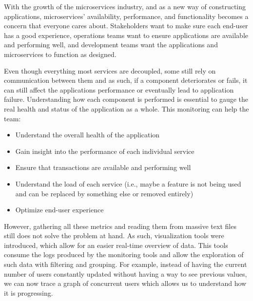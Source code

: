 
With the growth of the microservices industry, and as a new way of constructing applications, microservices' availability, performance, and functionality becomes a concern that everyone cares about. Stakeholders want to make sure each end-user has a good experience, operations teams want to ensure applications are available and performing well, and development teams want the applications and microservices to function as designed.

Even though everything most services are decoupled, some still rely on communication between them and as such, if a component deteriorates or fails, it can still affect the applications performance or eventually lead to application failure. Understanding how each component is performed is essential to gauge the real health and status of the application as a whole. This monitoring can help the team:

\begin{itemize}
    \item Understand the overall health of the application
    \item Gain insight into the performance of each individual service
    \item Ensure that transactions are available and performing well
    \item Understand the load of each service (i.e., maybe a feature is not being used and can be replaced by something else or removed entirely)
    \item Optimize end-user experience
\end{itemize}

However, gathering all these metrics and reading them from massive text files still does not solve the problem at hand. As such, visualization tools were introduced, which allow for an easier real-time overview of data. This tools consume the logs produced by the monitoring tools and allow the exploration of such data with filtering and grouping. For example, instead of having the current number of users constantly updated without having a way to see previous values, we can now trace a graph of concurrent users which allows us to understand how it is progressing.

